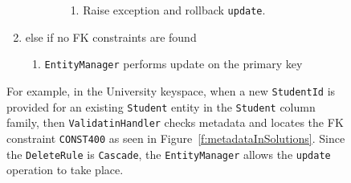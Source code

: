 \begin{description}
\begin{description}
\begin{enumerate}
\begin{enumerate}
\begin{enumerate}
\begin{enumerate}
				    	\item Raise exception and rollback \texttt{update}. 
				    	\end{enumerate}
				\end{enumerate}
			\end{enumerate}
		  \item else if no \ac{FK} constraints are found 
		  		\begin{enumerate}
		  		  \item \texttt{EntityManager}
		  performs update on the primary key
				\end{enumerate}
		 \end{enumerate}
		 
		
		For example,  in the University keyspace,  when a
		new \texttt{StudentId} is provided for an existing  \texttt{Student}
		entity in the \texttt{Student} column family,  then \texttt{ValidatinHandler}
		checks metadata and locates the \ac{FK} constraint \texttt{CONST400} as seen in
		Figure~\ref{f:metadataInSolutions}. Since the \texttt{DeleteRule} is
		\texttt{Cascade}, the \texttt{EntityManager} allows the \texttt{update}
		operation to take place.
		

\end{description}
\end{description}
